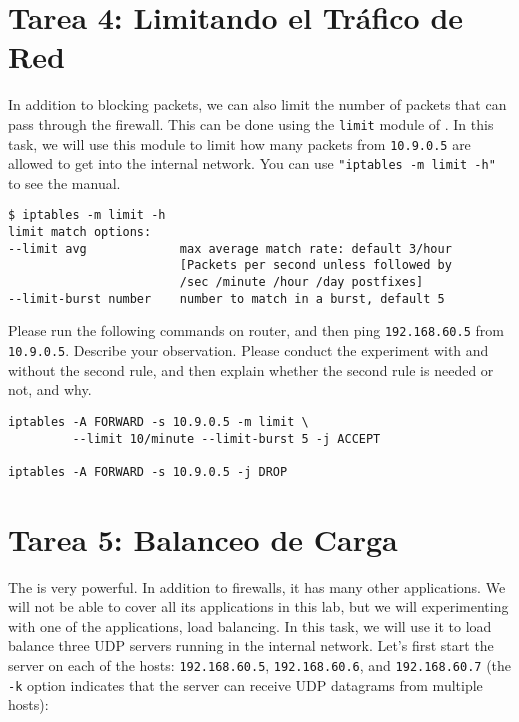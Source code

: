 \section{Tarea 4: Limitando el Tráfico de Red}

In addition to blocking packets, we can also 
limit the number of packets that can pass through the firewall. 
This can be done using the \texttt{limit} module of \iptables.
In this task, we will use this module to limit how many packets 
from \texttt{10.9.0.5} are allowed to get into the internal network. 
You can use \texttt{"iptables -m limit -h"} to see the manual.  

\begin{lstlisting}
$ iptables -m limit -h
limit match options:
--limit avg             max average match rate: default 3/hour
                        [Packets per second unless followed by
                        /sec /minute /hour /day postfixes]
--limit-burst number    number to match in a burst, default 5
\end{lstlisting}
 

Please run the following commands on router, and then
ping \texttt{192.168.60.5} from \texttt{10.9.0.5}.  
Describe your observation. 
Please conduct the experiment with and without the second rule, 
and then explain whether the second rule is needed or not, and why.

\begin{lstlisting}
iptables -A FORWARD -s 10.9.0.5 -m limit \
         --limit 10/minute --limit-burst 5 -j ACCEPT

iptables -A FORWARD -s 10.9.0.5 -j DROP
\end{lstlisting}



\section{Tarea 5: Balanceo de Carga}

The \iptables is very powerful. In addition to firewalls,
it has many other applications. We will not be able to 
cover all its applications in this lab, but we will experimenting
with one of the applications, load balancing. In this task,
we will use it to load balance three UDP servers running in the 
internal network. Let's first start the server
on each of the hosts: \texttt{192.168.60.5}, \texttt{192.168.60.6}, and 
\texttt{192.168.60.7} (the \texttt{-k} option indicates that 
the server can receive UDP datagrams from multiple hosts):

